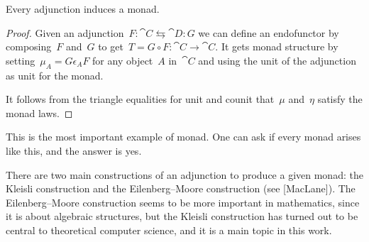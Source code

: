 \documentclass[../TFG.tex]{subfiles}
\begin{document}
\begin{proposition}
    \label{prop:adjunction-induces-monad}
    Every adjunction induces a monad.
\end{proposition}
\begin{proof}
    Given an adjunction~\(F:\cat{C}\leftrightarrows\cat{D}:G\) we can define an
    endofunctor by composing~\(F\) and~\(G\) to get~\(T = G \circ
    F:\cat{C}\longrightarrow\cat{C}\). It gets monad structure by
    setting~\(\mu_{A} = G \epsilon_{A}F\) for any object~\(A\) in~\(\cat{C}\)
    and using the unit of the adjunction as unit for the monad.

    It follows from the triangle equalities for unit and counit that~\(\mu\)
    and~\(\eta\) satisfy the monad laws.
\end{proof}
This is the most important example of monad. One can ask if every monad arises
like this, and the answer is yes.

There are two main constructions of an adjunction to produce a given monad: the
Kleisli construction and the Eilenberg--Moore construction (see [MacLane]).
The Eilenberg--Moore construction seems to be more important in mathematics,
since it is about algebraic structures, but the Kleisli construction has turned
out to be central to theoretical computer science, and it is a main topic in
this work.

\end{document}
